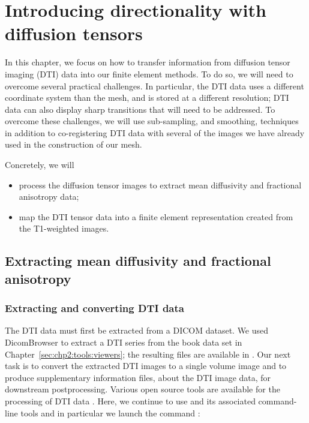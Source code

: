 \chapter{Introducing directionality with diffusion tensors}
\label{chap:dti}

In this chapter, we focus on how to transfer information from
diffusion tensor imaging (DTI) data into our finite element
methods. To do so, we will need to overcome several practical
challenges. In particular, the DTI data uses a different coordinate
system than the mesh, and is stored at a different resolution; DTI
data can also display sharp transitions that will need to be
addressed. To overcome these challenges, we will use sub-sampling, and
smoothing, techniques in addition to co-registering DTI data with
several of the images we have already used in the construction of our
mesh.

Concretely, we will
\begin{itemize}
\item
  process the diffusion tensor images to extract mean diffusivity and
  fractional anisotropy data;
\item
  map the DTI tensor data into a finite element representation created from
  the T1-weighted images.
\end{itemize}

\section{Extracting mean diffusivity and fractional anisotropy}

\subsection{Extracting and converting DTI data}
\label{sec:chp-dti:extract-and-convert}

The DTI data must first be extracted from a DICOM dataset. We used
DicomBrowser to extract a DTI series from the book data set in
Chapter~\ref{sec:chp2:tools:viewers}; the resulting files are
available in . Our next task is to convert the
extracted DTI images to a single volume image and to produce
supplementary information files, about the DTI image data, for
downstream postprocessing.  Various open source tools are available
for the processing of DTI data \cite{soares2013hitchhiker}. Here, we
continue to use \freesurfer{} and its associated command-line tools
and in particular we launch the command :

